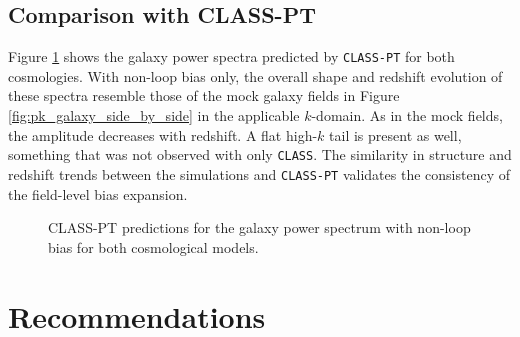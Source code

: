 \documentclass[trackchanges]{aastex7}
\begin{document}
\subsection{Comparison with CLASS-PT}

Figure \ref{fig:pk_classpt_side_by_side} shows the galaxy power spectra predicted by \texttt{CLASS-PT} for both cosmologies.
With non-loop bias only, the overall shape and redshift evolution of these spectra resemble those of the mock galaxy fields in Figure \ref{fig:pk_galaxy_side_by_side} in the applicable $k$-domain.
As in the mock fields, the amplitude decreases with redshift. 
A flat high-$k$ tail is present as well, something that was not observed with only \texttt{CLASS}.
The similarity in structure and redshift trends between the simulations and \texttt{CLASS-PT} validates the consistency of the field-level bias expansion.
\begin{figure}[ht]
    \centering
    \hfill
    \caption{CLASS-PT predictions for the galaxy power spectrum with non-loop bias for both cosmological models.}
    \label{fig:pk_classpt_side_by_side}
\end{figure}


\section{Recommendations} \label{sec:recommendations}
\end{document}
